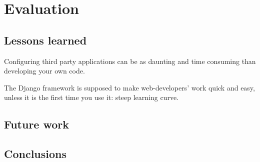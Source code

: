 \chapter{Evaluation}

\section{Lessons learned}
Configuring third party applications can be as daunting and time consuming than
developing your own code.

The Django framework is supposed to make web-developers' work quick and easy,
unless it is the first time you use it: steep learning curve.

\section{Future work}

\section{Conclusions}

